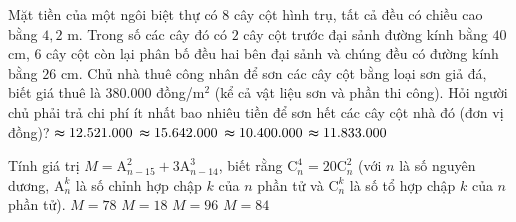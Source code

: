 \begin{ex}%
Mặt tiền của một ngôi biệt thự có $8$ cây cột hình trụ, tất cả đều có chiều cao bằng $4{,}2$ m. Trong số các cây đó có $2$ cây cột trước đại sảnh đường kính bằng $40$ cm, $6$ cây cột còn lại phân bố đều hai bên đại sảnh và chúng đều có đường kính bằng $26$ cm. Chủ nhà thuê công nhân để sơn các cây cột bằng loại sơn giả đá, biết giá thuê là $380.000$ đồng/m$^2$ (kể cả vật liệu sơn và phần thi công). Hỏi người chủ phải trả chi phí ít nhất bao nhiêu tiền để sơn hết các cây cột nhà đó (đơn vị đồng)?
\choice
{$\thickapprox 12.521.000$}
{$\thickapprox 15.642.000$}
{$\thickapprox 10.400.000$}
{\True $\thickapprox 11.833.000$}
\end{ex}

\begin{ex}%
Tính giá trị $M=\mathrm{A}_{n-15}^2+3\mathrm{A}_{n-14}^3$, biết rằng $\mathrm{C}_n^4=20\mathrm{C}_n^2$ (với $n$ là số nguyên dương, $\mathrm{A}_n^k$ là số chỉnh hợp chập $k$ của $n$ phần tử và $\mathrm{C}_n^k$ là số tổ hợp chập $k$ của $n$ phần tử).
\choice
{\True $M=78$}
{$M=18$}
{$M=96$}
{$M=84$}
\end{ex}

